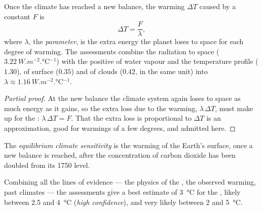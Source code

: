 \begin{proposition}\label{prop:g12:climate-change:equilibrium}
Once the climate has reached a new balance, the warming $\Delta T$ caused by
a constant  $F$ is
\[
  \Delta T = \frac{F}{\lambda},
\]
where $\lambda$, the \emph{ parameter}, is the extra energy
the planet loses to space for each degree of warming. The assessments
combine the radiation to space ($\qty{3.22}{W.m^{-2}.\degreeCelsius^{-1}}$)
with the positive  of water vapour and the temperature profile
($1.30$), of surface  ($0.35$) and of clouds ($0.42$, in the same
unit) into $\lambda \approx \qty{1.16}{W.m^{-2}.\degreeCelsius^{-1}}$.
\end{proposition}

\begin{proof}[Partial proof]
At the new balance the climate system again loses to space as much energy
as it gains, so the extra loss due to the warming, $\lambda\,\Delta T$, must
make up for the : $\lambda\,\Delta T = F$. That the extra loss is
proportional to $\Delta T$ is an approximation, good for warmings of a few
degrees, and admitted here.
\end{proof}

\begin{definition}\label{def:g12:climate-change:ecs}
The \emph{equilibrium climate sensitivity}
is the warming of the Earth's surface, once a new balance is reached, after
the concentration of carbon dioxide has been doubled from its 1750 level.
\end{definition}

\begin{proposition}\label{prop:g12:climate-change:ecs}
Combining all the lines of evidence --- the physics of the , the
observed warming, past climates --- the assessments give a best estimate
of \qty{3}{\degreeCelsius} for the , likely
between 2.5 and \qty{4}{\degreeCelsius} (\emph{high confidence}), and very
likely between 2 and \qty{5}{\degreeCelsius}.
\end{proposition}

